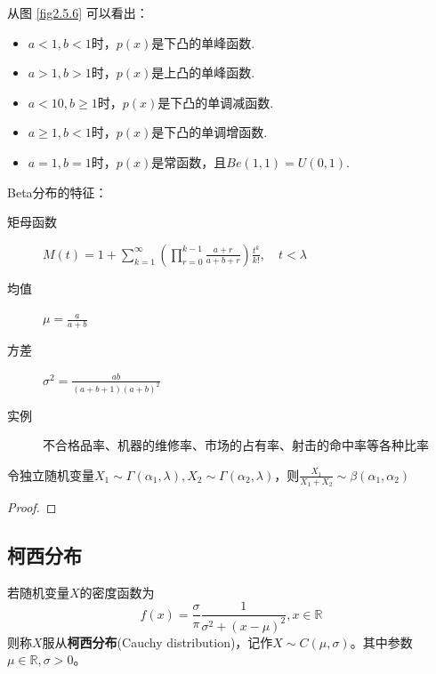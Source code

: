 从图 \ref{fig2.5.6} 可以看出：
\begin{itemize}
    \item $a<1,b<1$时，$p(x)$是下凸的单峰函数.
    \item $a>1,b>1$时，$p(x)$是上凸的单峰函数.
    \item $a<10,b\ge1$时，$p(x)$是下凸的单调减函数.
    \item $a\ge1,b<1$时，$p(x)$是下凸的单调增函数.
    \item $a=1,b=1$时，$p(x)$是常函数，且\underline{$Be(1,1)=U(0,1)$}.
\end{itemize}

Beta分布的特征：
\begin{description}
    \item[矩母函数] $M(t)=1+\sum_{k=1}^{\infty}(\prod_{r=0}^{k-1} \frac{a+r}{a+b+r})\frac{t^k}{k!}, \quad t<\lambda$
    \item[均值] $\mu=\frac{a}{a+b}$
    \item[方差] $\sigma^2=\frac{ab}{(a+b+1)(a+b)^{2}}$
    \item[实例] 不合格品率、机器的维修率、市场的占有率、射击的命中率等各种比率
\end{description}

\begin{proposition}
    令独立随机变量$X_1 \sim \Gamma(\alpha_1,\lambda),X_2 \sim  \Gamma(\alpha_2,\lambda)$，则$\frac{X_1}{X_1+X_2} \sim \beta(\alpha_1,\alpha_2)$
\end{proposition}
\begin{proof}
\end{proof}

\subsection{柯西分布}

\begin{definition}
    若随机变量$X$的密度函数为
    \[ f(x) = \frac{\sigma}{\pi} \frac1{\sigma^2+(x-\mu)^2} ,x \in \mathbb{R} \]
    则称$X$服从\textbf{柯西分布}(Cauchy distribution)，记作$X\sim C(\mu,\sigma)$。其中参数$\mu \in \mathbb{R},\sigma>0$。
\end{definition}

